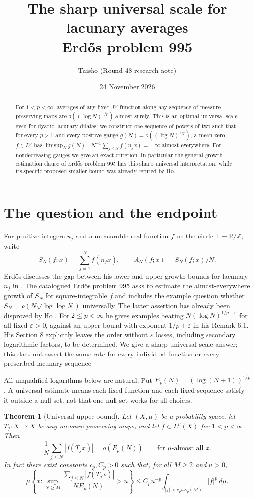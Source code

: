 \documentclass[11pt]{article}
\title{The sharp universal scale for lacunary averages\\
Erd\H{o}s problem 995}
\author{Taisho \textnormal{(Round 48 research note)}}
\date{24 November 2026}
\newtheorem{theorem}{Theorem}
\newcommand{\T}{\mathbb T}
\newcommand{\R}{\mathbb R}
\begin{document}
\maketitle
\begin{abstract}
For $1<p<\infty$, averages of any fixed $L^p$ function along any sequence of measure-preserving maps are $o((\log N)^{1/p})$ almost surely. This is an optimal universal scale even for dyadic lacunary dilates: we construct one sequence of powers of two such that, for every $p>1$ and every positive gauge $g(N)=o((\log N)^{1/p})$, a mean-zero $f\in L^p$ has $\limsup_N g(N)^{-1}N^{-1}\sum_{j\le N} f(n_j x)=+\infty$ almost everywhere. For nondecreasing gauges we give an exact criterion. In particular the general growth-estimation clause of Erd\H{o}s problem 995 has this sharp universal interpretation, while its specific proposed smaller bound was already refuted by Ho.
\end{abstract}

\section{The question and the endpoint}
For positive integers $n_j$ and a measurable real function $f$ on the circle $\T=\R/\mathbb Z$, write
\[
 S_N(f;x)=\sum_{j=1}^N f(n_jx),\qquad A_N(f;x)=S_N(f;x)/N.
\]
Erd\H{o}s discusses the gap between his lower and upper growth bounds for lacunary $n_j$ in \cite[Section II, p.~58, (15)--(16)]{erdos}. The catalogued \href{https://www.erdosproblems.com/995}{Erd\H{o}s problem 995} asks to estimate the almost-everywhere growth of $S_N$ for square-integrable $f$ and includes the example question whether $S_N=o(N\sqrt{\log\log N})$ universally. The latter assertion has already been disproved by Ho \cite[Theorem 1.2]{ho}. For $2\le p<\infty$ he gives examples beating $N(\log N)^{1/p-\varepsilon}$ for all fixed $\varepsilon>0$, against an upper bound with exponent $1/p+\varepsilon$ in his Remark 6.1. His Section 8 explicitly leaves the order without $\varepsilon$ losses, including secondary logarithmic factors, to be determined. We give a sharp universal-scale answer; this does not assert the same rate for every individual function or every prescribed lacunary sequence.

All unqualified logarithms below are natural. Put $E_p(N)=(\log(N+1))^{1/p}$. A universal estimate means each fixed function and each fixed sequence satisfy it outside a null set, not that one null set works for all choices.

\begin{theorem}[Universal upper bound]\label{thm:upper}
Let $(X,\mu)$ be a probability space, let $T_j:X\to X$ be any measure-preserving maps, and let $f\in L^p(X)$ for $1<p<\infty$. Then
\[
 \frac1N\sum_{j\le N}|f(T_jx)|=o(E_p(N)) \qquad\text{for $\mu$-almost all \(x\)}.
\]
In fact there exist constants $c_p,C_p>0$ such that, for all $M\ge2$ and $u>0$,
\[
 \mu\left\{x:\sup_{N\ge M}\frac{\sum_{j\le N}|f(T_jx)|}{N E_p(N)}>u\right\}
 \le C_p u^{-p}\int_{|f|>c_puE_p(M)}|f|^p\,d\mu .
 \tag{1}\label{eq:max}
\]
\end{theorem}
\end{document}
